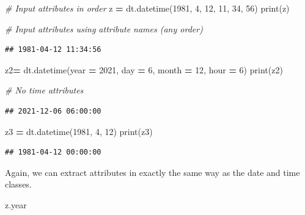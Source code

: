 \documentclass[
]{book}
\newenvironment{Shaded}{\begin{snugshade}}{\end{snugshade}}
\newcommand{\BuiltInTok}[1]{#1}
\newcommand{\CommentTok}[1]{\textcolor[rgb]{0.56,0.35,0.01}{\textit{#1}}}
\newcommand{\DecValTok}[1]{\textcolor[rgb]{0.00,0.00,0.81}{#1}}
\newcommand{\NormalTok}[1]{#1}
\newcommand{\OperatorTok}[1]{\textcolor[rgb]{0.81,0.36,0.00}{\textbf{#1}}}
\begin{document}
\begin{Shaded}
\begin{Highlighting}[]
\CommentTok{\# Input attributes in order}
\NormalTok{z }\OperatorTok{=}\NormalTok{ dt.datetime(}\DecValTok{1981}\NormalTok{, }\DecValTok{4}\NormalTok{, }\DecValTok{12}\NormalTok{, }\DecValTok{11}\NormalTok{, }\DecValTok{34}\NormalTok{, }\DecValTok{56}\NormalTok{)}
\BuiltInTok{print}\NormalTok{(z)}

\CommentTok{\# Input attributes using attribute names (any order)}
\end{Highlighting}
\end{Shaded}

\begin{verbatim}
## 1981-04-12 11:34:56
\end{verbatim}

\begin{Shaded}
\begin{Highlighting}[]
\NormalTok{z2}\OperatorTok{=}\NormalTok{ dt.datetime(year }\OperatorTok{=} \DecValTok{2021}\NormalTok{, day }\OperatorTok{=} \DecValTok{6}\NormalTok{, month }\OperatorTok{=} \DecValTok{12}\NormalTok{, hour }\OperatorTok{=} \DecValTok{6}\NormalTok{)}
\BuiltInTok{print}\NormalTok{(z2)}

\CommentTok{\# No time attributes}
\end{Highlighting}
\end{Shaded}

\begin{verbatim}
## 2021-12-06 06:00:00
\end{verbatim}

\begin{Shaded}
\begin{Highlighting}[]
\NormalTok{z3 }\OperatorTok{=}\NormalTok{ dt.datetime(}\DecValTok{1981}\NormalTok{, }\DecValTok{4}\NormalTok{, }\DecValTok{12}\NormalTok{)}
\BuiltInTok{print}\NormalTok{(z3)}
\end{Highlighting}
\end{Shaded}

\begin{verbatim}
## 1981-04-12 00:00:00
\end{verbatim}

Again, we can extract attributes in exactly the same way as the date and time classes.

\begin{Shaded}
\begin{Highlighting}[]
\NormalTok{z.year}
\end{Highlighting}
\end{Shaded}
\end{document}
